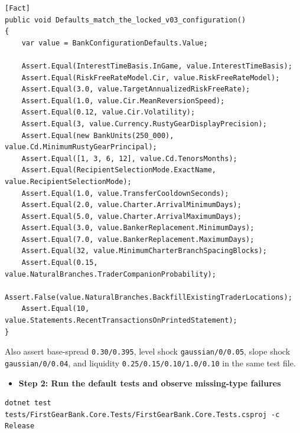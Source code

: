 \documentclass[
  10pt,
  letterpaper,
]{article}
\providecommand{\tightlist}{%
  \setlength{\itemsep}{0pt}\setlength{\parskip}{0pt}}
\begin{document}
\begin{lstlisting}
[Fact]
public void Defaults_match_the_locked_v03_configuration()
{
    var value = BankConfigurationDefaults.Value;

    Assert.Equal(InterestTimeBasis.InGame, value.InterestTimeBasis);
    Assert.Equal(RiskFreeRateModel.Cir, value.RiskFreeRateModel);
    Assert.Equal(3.0, value.TargetAnnualizedRiskFreeRate);
    Assert.Equal(1.0, value.Cir.MeanReversionSpeed);
    Assert.Equal(0.12, value.Cir.Volatility);
    Assert.Equal(3, value.Currency.RustyGearDisplayPrecision);
    Assert.Equal(new BankUnits(250_000), value.Cd.MinimumRustyGearPrincipal);
    Assert.Equal([1, 3, 6, 12], value.Cd.TenorsMonths);
    Assert.Equal(RecipientSelectionMode.ExactName, value.RecipientSelectionMode);
    Assert.Equal(1.0, value.TransferCooldownSeconds);
    Assert.Equal(2.0, value.Charter.ArrivalMinimumDays);
    Assert.Equal(5.0, value.Charter.ArrivalMaximumDays);
    Assert.Equal(3.0, value.BankerReplacement.MinimumDays);
    Assert.Equal(7.0, value.BankerReplacement.MaximumDays);
    Assert.Equal(32, value.MinimumCharterBranchSpacingBlocks);
    Assert.Equal(0.15, value.NaturalBranches.TraderCompanionProbability);
    Assert.False(value.NaturalBranches.BackfillExistingTraderLocations);
    Assert.Equal(10, value.Statements.RecentTransactionsOnPrintedStatement);
}
\end{lstlisting}

Also assert base-spread
\texttt{0.}\allowbreak{}\texttt{30/}\allowbreak{}\texttt{0.}\allowbreak{}\texttt{395},
level shock
\texttt{gaussian/}\allowbreak{}\texttt{0/}\allowbreak{}\texttt{0.}\allowbreak{}\texttt{05},
slope shock
\texttt{gaussian/}\allowbreak{}\texttt{0/}\allowbreak{}\texttt{0.}\allowbreak{}\texttt{04},
and liquidity
\texttt{0.}\allowbreak{}\texttt{25/}\allowbreak{}\texttt{0.}\allowbreak{}\texttt{15/}\allowbreak{}\texttt{0.}\allowbreak{}\texttt{10/}\allowbreak{}\texttt{1.}\allowbreak{}\texttt{0/}\allowbreak{}\texttt{0.}\allowbreak{}\texttt{10}
in the same test file.

\begin{itemize}
\tightlist
\item[$\square$]
  \textbf{Step 2: Run the default tests and observe missing-type
  failures}
\end{itemize}

\begin{lstlisting}
dotnet test tests/FirstGearBank.Core.Tests/FirstGearBank.Core.Tests.csproj -c Release
\end{lstlisting}
\end{document}
